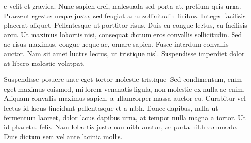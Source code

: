 c velit et gravida. Nunc sapien orci, malesuada sed porta at, pretium quis urna. Praesent egestas neque justo, sed feugiat arcu sollicitudin finibus. Integer facilisis placerat aliquet. Pellentesque ut porttitor risus. Duis eu congue lectus, eu facilisis arcu. Ut maximus lobortis nisi, consequat dictum eros convallis sollicitudin. Sed ac risus maximus, congue neque ac, ornare sapien. Fusce interdum convallis auctor. Nam sit amet luctus lectus, ut tristique nisl. Suspendisse imperdiet dolor at libero molestie volutpat.

Suspendisse posuere ante eget tortor molestie tristique. Sed condimentum, enim eget maximus euismod, mi lorem venenatis ligula, non molestie ex nulla ac enim. Aliquam convallis maximus sapien, a ullamcorper massa auctor eu. Curabitur vel lectus id lacus tincidunt pellentesque et a nibh. Donec dapibus, nulla ut fermentum laoreet, dolor lacus dapibus urna, at tempor nulla magna a tortor. Ut id pharetra felis. Nam lobortis justo non nibh auctor, ac porta nibh commodo. Duis dictum sem vel ante lacinia mollis. 